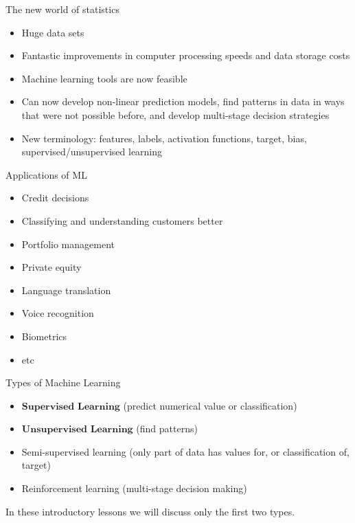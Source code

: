 \documentclass[11pt]{beamer}
\newcommand{\highlight}[1]{%
  \colorbox{yellow!100}{$\displaystyle#1$}}
\begin{document}
\begin{frame}{The new world of statistics}
	\begin{itemize}
		\item Huge data sets 
		\item Fantastic improvements in computer processing speeds and data storage costs
		\item Machine learning tools are now feasible
		\item Can now develop non-linear prediction models, find patterns in data in ways that were not possible before, and develop multi-stage decision strategies
		\item New terminology: features, labels, activation functions, target, bias, supervised/unsupervised learning
	\end{itemize}
\end{frame}
\begin{frame}{Applications of ML}
	\begin{itemize}
		\item Credit decisions
		\item Classifying and understanding customers better
		\item Portfolio management
		\item Private equity
		\item Language translation 
		\item Voice recognition
		\item Biometrics
		\item etc 
	\end{itemize}
\end{frame}
\begin{frame}{Types of Machine Learning }
	\begin{itemize}
		\item \highlight{\textbf{Supervised Learning}} (predict numerical value or classification)
		\item \highlight{\textbf{Unsupervised Learning}} (find patterns)
		\item Semi-supervised learning (only part of data has values for, or classification of, target)
		\item Reinforcement learning (multi-stage decision making)
	\end{itemize}

\vspace{1cm}
In these introductory lessons we will discuss only the first two types.	
\end{frame}
\end{document}
